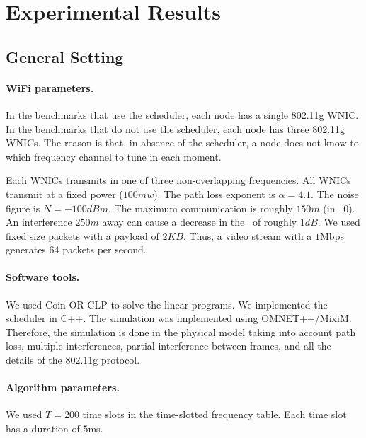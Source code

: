 \documentclass[12pt]{article}
\newenvironment{proof sketch}[1]{\noindent {\emph{Proof sketch of #1:}}}{\hfill \qed}
\newcommand{\SINR}{\text{\sc{sinr}}}
\newcommand{\MCS}{\text{\sc{mcs}}}
\begin{document}
\section{Experimental Results}

\subsection{General Setting}\label{sec:exp}


\paragraph{WiFi parameters.}  In the benchmarks that use the scheduler,
each node has a single 802.11g WNIC.  In the benchmarks that do not
use the scheduler, each node has three 802.11g WNICs.  The reason is
that, in absence of the scheduler, a node does not know to which
frequency channel to tune in each moment.

 Each WNICs transmits in one of three
non-overlapping frequencies.  All WNICs transmit at a fixed power
($100mw$). The path loss exponent is $\alpha=4.1$. The noise figure
is $N=-100dBm$. The maximum communication is roughly $150m$ (in \MCS\
$0$). An interference $250m$ away can cause a decrease in the \SINR\
of roughly $1dB$. We used fixed size packets with a payload of $2KB$.
Thus, a video stream with a $1$Mbps generates $64$ packets per second.



\paragraph{Software tools.}  We used Coin-OR CLP to solve the linear
programs.  We implemented the scheduler in C++.  The simulation was
implemented using OMNET++/MixiM. Therefore, the simulation is done in
the physical model taking into account path loss, multiple
interferences, partial interference between frames, and all the
details of the 802.11g protocol.

\paragraph{Algorithm parameters.} We used $T=200$ time slots in the
time-slotted frequency table.  Each time slot has a duration of $5$ms.
\end{document}
